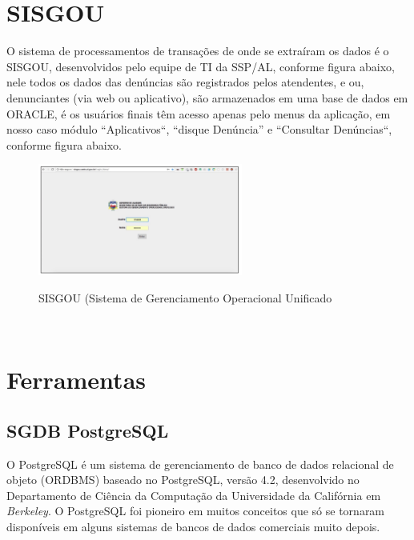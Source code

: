 \section{SISGOU}

O sistema de processamentos de transa\c{c}\~{o}es de onde se extra\'{i}ram os dados \'{e} o SISGOU, desenvolvidos pelo equipe de TI da SSP/AL, conforme figura abaixo, nele todos os dados das denúncias s\~{a}o registrados pelos atendentes, e ou, denunciantes (via web ou aplicativo), s\~{a}o armazenados em uma base de dados em ORACLE, \'{e} os usu\'{a}rios finais têm acesso apenas pelo menus da aplica\c{c}\~{a}o, em nosso caso m\'odulo ``Aplicativos``, ``disque Denúncia'' e ``Consultar Denúncias``, conforme figura abaixo.

\begin{figure}[H]
	\vspace*{0,2cm}
    \centering
    \caption{SISGOU (Sistema de Gerenciamento Operacional Unificado}
    \includegraphics[width=0.6\textwidth]{./04-figuras/figura-13}
    \label{fig:ilustfig13}
\end{figure}
\vspace*{-0,9cm}
{\raggedright {}}\\


\section{Ferramentas}


\subsection{SGDB PostgreSQL}

O PostgreSQL \'{e} um sistema de gerenciamento de banco de dados relacional de objeto (ORDBMS) baseado no 
PostgreSQL, vers\~{a}o 4.2, desenvolvido no Departamento de Ciência da Computa\c{c}\~{a}o da Universidade da Calif\'ornia em \textit{Berkeley}. O PostgreSQL foi pioneiro em muitos conceitos que s\'{o} se tornaram dispon\'{i}veis em alguns sistemas de bancos de dados comerciais muito depois.

